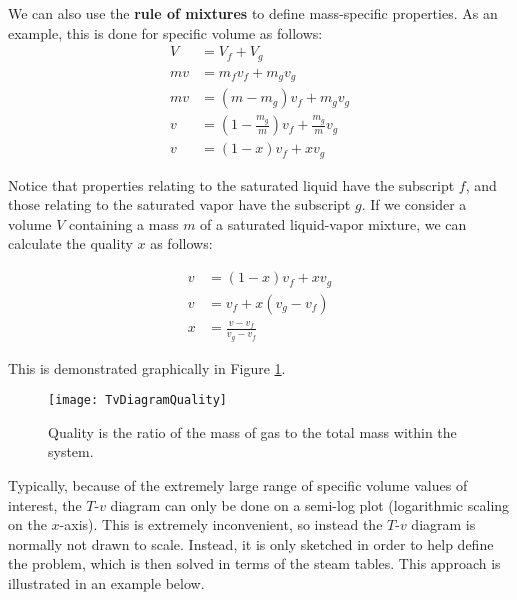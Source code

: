 We can also use the {\bf rule of mixtures} to define mass-specific properties.  As an example, this is done for specific volume as follows:
\begin{align*}
  V &= V_f + V_g \\
  m v &= m_f v_f + m_g v_g \\
  m v &= (m-m_g) v_f + m_g v_g \\
  v &= \left(1 - \frac{m_g}{m}\right) v_f + \frac{m_g}{m} v_g \\
  v &= (1-x) v_f + x v_g
\end{align*}

Notice that properties relating to the saturated liquid have the subscript $f$, and those relating to the saturated vapor have the subscript $g$. If we consider a volume $V$ containing a mass $m$ of a saturated liquid-vapor mixture, we can calculate the quality $x$ as follows:

\begin{align}
  \nonumber v &= (1-x) v_f + x v_g\\
  \nonumber v &= v_f + x\left(v_g - v_f\right)\\
  \label{eq:quality2} x &= \frac{v - v_f}{v_g - v_f}
\end{align}

This is demonstrated graphically in Figure \ref{fig:ch2_TvDiagram4}.

\begin{figure}[H]
\centering
\texttt{[image: TvDiagramQuality]}
\caption{Quality is the ratio of the mass of gas to the total mass within the system.}
\label{fig:ch2_TvDiagram4}
\end{figure}


Typically, because of the extremely large range of specific volume values of interest, the $T$-$v$ diagram can only be done on a semi-log plot (logarithmic scaling on the $x$-axis). This is extremely inconvenient, so instead the $T$-$v$ diagram is normally not drawn to scale. Instead, it is only sketched in order to help define the problem, which is then solved in terms of the steam tables. This approach is illustrated in an example below.

